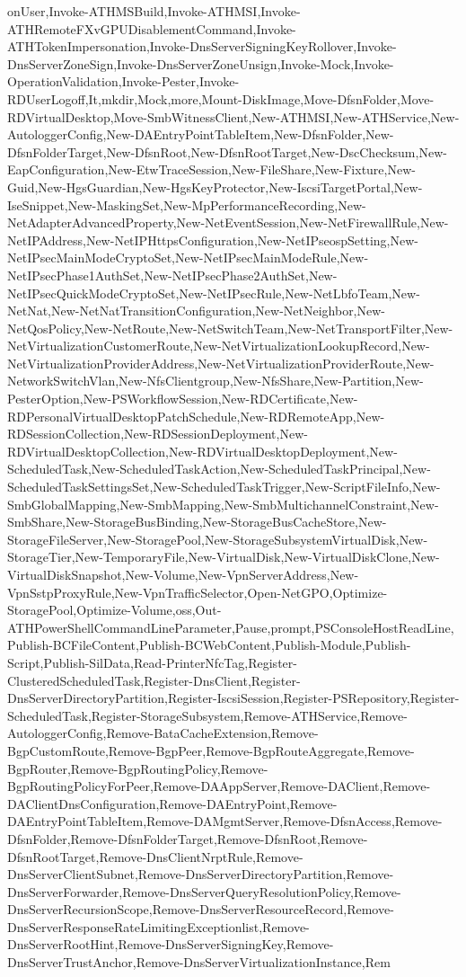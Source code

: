 {{onUser,Invoke-ATHMSBuild,Invoke-ATHMSI,Invoke-ATHRemoteFXvGPUDisablementCommand,Invoke-ATHTokenImpersonation,Invoke-DnsServerSigningKeyRollover,Invoke-DnsServerZoneSign,Invoke-DnsServerZoneUnsign,Invoke-Mock,Invoke-OperationValidation,Invoke-Pester,Invoke-RDUserLogoff,It,mkdir,Mock,more,Mount-DiskImage,Move-DfsnFolder,Move-RDVirtualDesktop,Move-SmbWitnessClient,New-ATHMSI,New-ATHService,New-AutologgerConfig,New-DAEntryPointTableItem,New-DfsnFolder,New-DfsnFolderTarget,New-DfsnRoot,New-DfsnRootTarget,New-DscChecksum,New-EapConfiguration,New-EtwTraceSession,New-FileShare,New-Fixture,New-Guid,New-HgsGuardian,New-HgsKeyProtector,New-IscsiTargetPortal,New-IseSnippet,New-MaskingSet,New-MpPerformanceRecording,New-NetAdapterAdvancedProperty,New-NetEventSession,New-NetFirewallRule,New-NetIPAddress,New-NetIPHttpsConfiguration,New-NetIPseospSetting,New-NetIPsecMainModeCryptoSet,New-NetIPsecMainModeRule,New-NetIPsecPhase1AuthSet,New-NetIPsecPhase2AuthSet,New-NetIPsecQuickModeCryptoSet,New-NetIPsecRule,New-NetLbfoTeam,New-NetNat,New-NetNatTransitionConfiguration,New-NetNeighbor,New-NetQosPolicy,New-NetRoute,New-NetSwitchTeam,New-NetTransportFilter,New-NetVirtualizationCustomerRoute,New-NetVirtualizationLookupRecord,New-NetVirtualizationProviderAddress,New-NetVirtualizationProviderRoute,New-NetworkSwitchVlan,New-NfsClientgroup,New-NfsShare,New-Partition,New-PesterOption,New-PSWorkflowSession,New-RDCertificate,New-RDPersonalVirtualDesktopPatchSchedule,New-RDRemoteApp,New-RDSessionCollection,New-RDSessionDeployment,New-RDVirtualDesktopCollection,New-RDVirtualDesktopDeployment,New-ScheduledTask,New-ScheduledTaskAction,New-ScheduledTaskPrincipal,New-ScheduledTaskSettingsSet,New-ScheduledTaskTrigger,New-ScriptFileInfo,New-SmbGlobalMapping,New-SmbMapping,New-SmbMultichannelConstraint,New-SmbShare,New-StorageBusBinding,New-StorageBusCacheStore,New-StorageFileServer,New-StoragePool,New-StorageSubsystemVirtualDisk,New-StorageTier,New-TemporaryFile,New-VirtualDisk,New-VirtualDiskClone,New-VirtualDiskSnapshot,New-Volume,New-VpnServerAddress,New-VpnSstpProxyRule,New-VpnTrafficSelector,Open-NetGPO,Optimize-StoragePool,Optimize-Volume,oss,Out-ATHPowerShellCommandLineParameter,Pause,prompt,PSConsoleHostReadLine,Publish-BCFileContent,Publish-BCWebContent,Publish-Module,Publish-Script,Publish-SilData,Read-PrinterNfcTag,Register-ClusteredScheduledTask,Register-DnsClient,Register-DnsServerDirectoryPartition,Register-IscsiSession,Register-PSRepository,Register-ScheduledTask,Register-StorageSubsystem,Remove-ATHService,Remove-AutologgerConfig,Remove-BataCacheExtension,Remove-BgpCustomRoute,Remove-BgpPeer,Remove-BgpRouteAggregate,Remove-BgpRouter,Remove-BgpRoutingPolicy,Remove-BgpRoutingPolicyForPeer,Remove-DAAppServer,Remove-DAClient,Remove-DAClientDnsConfiguration,Remove-DAEntryPoint,Remove-DAEntryPointTableItem,Remove-DAMgmtServer,Remove-DfsnAccess,Remove-DfsnFolder,Remove-DfsnFolderTarget,Remove-DfsnRoot,Remove-DfsnRootTarget,Remove-DnsClientNrptRule,Remove-DnsServerClientSubnet,Remove-DnsServerDirectoryPartition,Remove-DnsServerForwarder,Remove-DnsServerQueryResolutionPolicy,Remove-DnsServerRecursionScope,Remove-DnsServerResourceRecord,Remove-DnsServerResponseRateLimitingExceptionlist,Remove-DnsServerRootHint,Remove-DnsServerSigningKey,Remove-DnsServerTrustAnchor,Remove-DnsServerVirtualizationInstance,Rem}}
